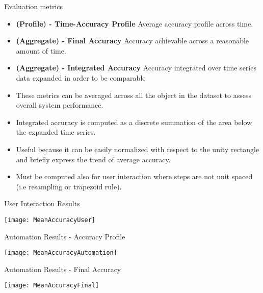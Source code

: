 \begin{frame}[t,fragile]{Evaluation metrics}
\begin{itemize}
  \item \textbf{(Profile) - Time-Accuracy Profile } Average accuracy profile across time.
  \item \textbf{(Aggregate) - Final Accuracy } Accuracy achievable across a reasonable amount of time.
  \item \textbf{(Aggregate) - Integrated Accuracy } Accuracy integrated over time series data expanded in order to be comparable 
\end{itemize}
\begin{itemize}
  \item These metrics can be averaged across all the object in the dataset to assess overall system performance.
  \item Integrated accuracy is computed as a discrete summation of the area below the expanded time series.
  \item Useful because it can be easily normalized with respect to the unity rectangle and briefly express the trend of average accuracy.
  \item  Must be computed also for user interaction where steps are not unit spaced (i.e resampling or trapezoid rule).
\end{itemize}
\end{frame}

\begin{frame}[t,fragile]{User Interaction Results}
\begin{center}
\texttt{[image: MeanAccuracyUser]}
\end{center}
\end{frame}

\begin{frame}[t,fragile]{Automation Results - Accuracy Profile}
\begin{center}
\texttt{[image: MeanAccuracyAutomation]}
\end{center}
\end{frame}

\begin{frame}[t,fragile]{Automation Results - Final Accuracy}
\begin{center}
\texttt{[image: MeanAccuracyFinal]}
\end{center}
\end{frame}

